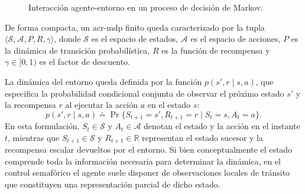 \begin{figure}[!htbp]
    \centering
    \caption{Interacción agente-entorno en un proceso de decisión de Markov.}
    \label{fig:agent_env_interaction}
\end{figure}

De forma compacta, un \acrshort{acr-mdp} finito queda caracterizado por la tupla $\langle \mathcal{S}, \mathcal{A}, P, R, \gamma \rangle$, donde $\mathcal{S}$ es el espacio de estados, $\mathcal{A}$ es el espacio de acciones, $P$ es la dinámica de transición probabilística, $R$ es la función de recompensa y $\gamma \in [0,1)$ es el factor de descuento.

La dinámica del entorno queda definida por la función $p(s', r \mid s, a)$, que especifica la probabilidad condicional conjunta de observar el próximo estado $s'$ y la recompensa $r$ al ejecutar la acción $a$ en el estado $s$:
\begin{equation}
    p(s', r \mid s, a) \doteq \Pr\{S_{t+1} = s', R_{t+1} = r \mid S_t = s, A_t = a\}.
    \label{eq:dinamica_mdp}
\end{equation}
En esta formulación, $S_t \in \mathcal{S}$ y $A_t \in \mathcal{A}$ denotan el estado y la acción en el instante $t$, mientras que $S_{t+1} \in \mathcal{S}$ y $R_{t+1} \in \mathbb{R}$ representan el estado sucesor y la recompensa escalar devueltos por el entorno. Si bien conceptualmente el estado comprende toda la información necesaria para determinar la dinámica, en el control semafórico el agente suele disponer de observaciones locales de tránsito que constituyen una representación parcial de dicho estado.

